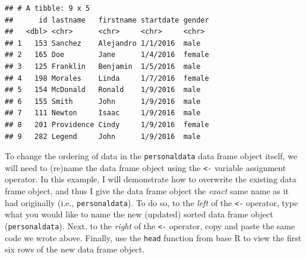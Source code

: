 \documentclass[]{book}
\newenvironment{Shaded}{\begin{snugshade}}{\end{snugshade}}
\newcommand{\KeywordTok}[1]{\textcolor[rgb]{0.13,0.29,0.53}{\textbf{#1}}}
\newcommand{\StringTok}[1]{\textcolor[rgb]{0.31,0.60,0.02}{#1}}
\newcommand{\CommentTok}[1]{\textcolor[rgb]{0.56,0.35,0.01}{\textit{#1}}}
\newcommand{\OperatorTok}[1]{\textcolor[rgb]{0.81,0.36,0.00}{\textbf{#1}}}
\newcommand{\NormalTok}[1]{#1}
\begin{document}
\begin{Shaded}
\end{Shaded}

\begin{verbatim}
## # A tibble: 9 x 5
##      id lastname   firstname startdate gender
##   <dbl> <chr>      <chr>     <chr>     <chr> 
## 1   153 Sanchez    Alejandro 1/1/2016  male  
## 2   165 Doe        Jane      1/4/2016  female
## 3   125 Franklin   Benjamin  1/5/2016  male  
## 4   198 Morales    Linda     1/7/2016  female
## 5   154 McDonald   Ronald    1/9/2016  male  
## 6   155 Smith      John      1/9/2016  male  
## 7   111 Newton     Isaac     1/9/2016  male  
## 8   201 Providence Cindy     1/9/2016  female
## 9   282 Legend     John      1/9/2016  male
\end{verbatim}

To change the ordering of data in the \texttt{personaldata} data frame
object itself, we will need to (re)name the data frame object using the
\texttt{\textless{}-} variable assignment operator. In this example, I
will demonstrate how to overwrite the existing data frame object, and
thus I give the data frame object the \emph{exact} same name as it had
originally (i.e., \texttt{personaldata}). To do so, to the \emph{left}
of the \texttt{\textless{}-} operator, type what you would like to name
the new (updated) sorted data frame object (\texttt{personaldata}).
Next, to the \emph{right} of the \texttt{\textless{}-} operator, copy
and paste the same code we wrote above. Finally, use the \texttt{head}
function from base R to view the first six rows of the new data frame
object.

\begin{Shaded}
\end{Shaded}
\end{document}
